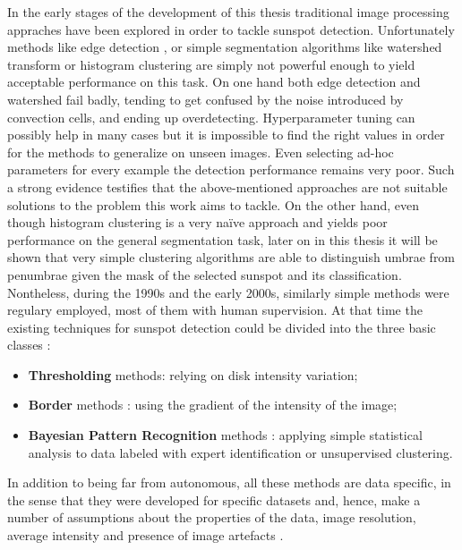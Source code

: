 In the early stages of the development of this thesis traditional image processing appraches have been explored in order to tackle sunspot detection. Unfortunately methods like edge detection \cite{canny1987computational}, or simple segmentation algorithms like watershed transform \cite{beucher1992watershed} or histogram clustering \cite{puzicha1999histogram} are simply not powerful enough to yield acceptable performance on this task. On one hand both edge detection and watershed fail badly, tending to get confused by the noise introduced by convection cells, and ending up overdetecting. Hyperparameter tuning can possibly help in many cases but it is impossible to find the right values in order for the methods to generalize on unseen images. Even selecting ad-hoc parameters for every example the detection performance remains very poor. Such a strong evidence testifies that the above-mentioned approaches are not suitable solutions to the problem this work aims to tackle. On the other hand, even though histogram clustering is a very na\"{i}ve approach and yields poor performance on the general segmentation task, later on in this thesis it will be shown that very simple clustering algorithms are able to distinguish umbrae from penumbrae given the mask of the selected sunspot and its classification.\\
Nontheless, during the 1990s and the early 2000s, similarly simple methods were regulary employed, most of them with human supervision. At that time the existing techniques for sunspot detection could be divided into the three basic classes \cite{zharkov2004}:
\begin{itemize}
  \item \textbf{Thresholding} methods: relying on disk intensity variation;
  \item \textbf{Border} methods \cite{pettauer1997novel}: using the gradient of the intensity of the image;
  \item \textbf{Bayesian Pattern Recognition} methods \cite{turmon2002statistical}: applying simple statistical analysis to data labeled with expert identification or unsupervised clustering.
\end{itemize}
In addition to being far from autonomous, all these methods are data specific, in the sense that they were developed for specific datasets and, hence, make a number of assumptions about the properties of the data, image resolution, average intensity and presence of image artefacts \cite{zharkov2004}.\\
